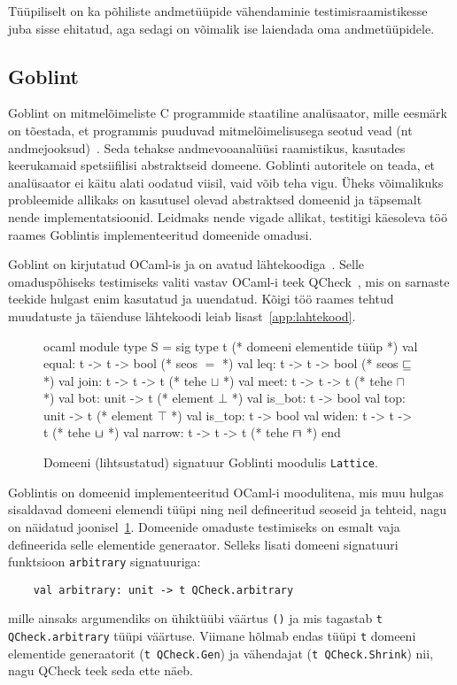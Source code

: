 \documentclass[../thesis.tex]{subfiles}
\begin{document}
Tüüpiliselt on ka põhiliste andmetüüpide vähendaminie testimisraamistikesse juba sisse ehitatud, aga sedagi on võimalik ise laiendada oma andmetüüpidele.

\subsection{Goblint}
Goblint on mitmelõimeliste C programmide staatiline analüsaator, mille eesmärk on tõestada, et programmis puuduvad mitmelõimelisusega seotud vead (nt andmejooksud)~\cite{goblint2016}. Seda tehakse andmevooanalüüsi raamistikus, kasutades keerukamaid spetsiifilisi abstraktseid domeene. Goblinti autoritele on teada, et analüsaator ei käitu alati oodatud viisil, vaid võib teha vigu. Üheks võimalikuks probleemide allikaks on kasutusel olevad abstraktsed domeenid ja täpsemalt nende implementatsioonid. Leidmaks nende vigade allikat, testitigi käesoleva töö raames Goblintis implementeeritud domeenide omadusi.

Goblint on kirjutatud OCaml-is ja on avatud lähtekoodiga~\cite{goblint_repo}. Selle omaduspõhiseks testimiseks valiti vastav OCaml-i teek QCheck~\cite{qcheck_repo}, mis on sarnaste teekide hulgast enim kasutatud ja uuendatud. Kõigi töö raames tehtud muudatuste ja täienduse lähtekoodi leiab lisast~\ref{app:lahtekood}.

\begin{figure}
	\centering
	\begin{bminted}[mathescape]{ocaml}
		module type S =
		sig
		  type t (* domeeni elementide tüüp *)
		  val equal: t -> t -> bool (* seos $=$ *)
		  val leq: t -> t -> bool (* seos $\sqsubseteq$ *)
		  val join: t -> t -> t (* tehe $\sqcup$ *)
		  val meet: t -> t -> t (* tehe $\sqcap$ *)
		  val bot: unit -> t (* element $\bot$ *)
		  val is_bot: t -> bool
		  val top: unit -> t (* element $\top$ *)
		  val is_top: t -> bool
		  val widen: t -> t -> t (* tehe $\widen$ *)
		  val narrow: t -> t -> t (* tehe $\narrow$ *)
		end
	\end{bminted}
	\caption{Domeeni (lihtsustatud) signatuur Goblinti moodulis \texttt{Lattice}.}
	\label{fig:lattice-s}
\end{figure}

Goblintis on domeenid implementeeritud OCaml-i moodulitena, mis muu hulgas sisaldavad domeeni elemendi tüüpi ning neil defineeritud seoseid ja tehteid, nagu on näidatud joonisel~\ref{fig:lattice-s}. Domeenide omaduste testimiseks on esmalt vaja defineerida selle elementide generaator. Selleks lisati domeeni signatuuri funktsioon \texttt{arbitrary} signatuuriga:
\begin{verbatim}
	val arbitrary: unit -> t QCheck.arbitrary
\end{verbatim}
mille ainsaks argumendiks on ühiktüübi väärtus \texttt{()} ja mis tagastab \texttt{t QCheck.arbitrary} tüüpi väärtuse. Viimane hõlmab endas tüüpi \texttt{t} domeeni elementide generaatorit (\texttt{t QCheck.Gen}) ja vähendajat (\texttt{t QCheck.Shrink}) nii, nagu QCheck teek seda ette näeb.
\end{document}
